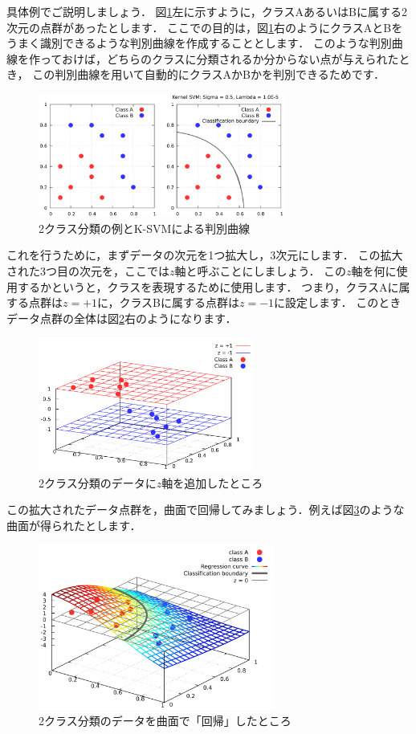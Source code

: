 具体例でご説明しましょう．
図\ref{fig:example_1}左に示すように，クラスAあるいはBに属する2次元の点群があったとします．
ここでの目的は，図\ref{fig:example_1}右のようにクラスAとBをうまく識別できるような判別曲線を作成することとします．
このような判別曲線を作っておけば，どちらのクラスに分類されるか分からない点が与えられたとき，
この判別曲線を用いて自動的にクラスAかBかを判別できるためです．
\begin{figure}[t]
    \centerline{\includegraphics[width=230pt]{figures/example_ksvm_1.pdf}}
    \caption{2クラス分類の例とK-SVMによる判別曲線}
    \label{fig:example_1}
\end{figure}
これを行うために，まずデータの次元を1つ拡大し，3次元にします．
この拡大された3つ目の次元を，ここでは$z$軸と呼ぶことにしましょう．
この$z$軸を何に使用するかというと，クラスを表現するために使用します．
つまり，クラスAに属する点群は$z = +1$に，クラスBに属する点群は$z = -1$に設定します．
このときデータ点群の全体は図\ref{fig:example_2}右のようになります．
\begin{figure}[t]
    \centerline{\includegraphics[width=200pt]{figures/example_ksvm_2.pdf}}
    \caption{2クラス分類のデータに$z$軸を追加したところ}
    \label{fig:example_2}
\end{figure}
この拡大されたデータ点群を，曲面で回帰してみましょう．例えば図\ref{fig:example_3}のような曲面が得られたとします．
\begin{figure}[t]
    \centerline{\includegraphics[width=220pt]{figures/example_ksvm_3.pdf}}
    \caption{2クラス分類のデータを曲面で「回帰」したところ}
    \label{fig:example_3}
\end{figure}
